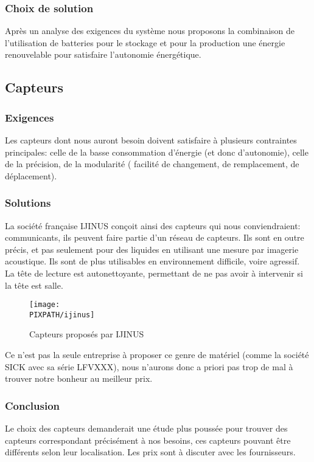 \subsubsection{Choix de solution}
Après un analyse des exigences du syst\`eme nous proposons la combinaison de l'utilisation de batteries pour le stockage et pour la production une \'{e}nergie renouvelable pour satisfaire l'autonomie \'{e}nerg\'{e}tique.

\subsection{Capteurs}

    \subsubsection{Exigences}
    Les capteurs dont nous auront besoin doivent satisfaire à plusieurs
    contraintes principales: celle de la basse consommation d'énergie
    (et donc d'autonomie), celle de la précision, de la modularité (
    facilité de changement, de remplacement, de déplacement).

    \subsubsection{Solutions}
    La société française IJINUS conçoit ainsi des capteurs qui nous
    conviendraient: communicants, ils peuvent faire partie d'un
    réseau de capteurs. Ils sont en outre précis, et pas seulement
    pour des liquides en utilisant une mesure par imagerie acoustique.
    Ils sont de plus utilisables en environnement difficile, voire agressif.
    La tête de lecture est autonettoyante, permettant de ne pas avoir
    à intervenir si la tête est salle.

    \begin{figure}[!h]
    \begin{center}
    \texttt{[image: \\PIXPATH/ijinus]}
    \caption{Capteurs proposés par IJINUS}
    \end{center}
    \end{figure}

    Ce n'est pas la seule entreprise à proposer ce genre de matériel (comme la société SICK avec sa série LFVXXX), nous
    n'aurons donc a priori pas trop de mal à trouver notre bonheur au meilleur
    prix.

    \subsubsection{Conclusion}
    Le choix des capteurs demanderait une étude plus poussée
    pour trouver des capteurs correspondant précisément à nos besoins,
    ces capteurs pouvant être différents selon leur localisation.
    Les prix sont à discuter avec les fournisseurs.

